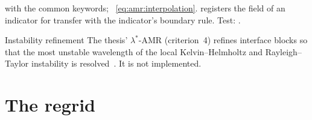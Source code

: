 \begin{implnote}
with the common keywords; ~\cref{eq:amr:interpolation}.
 registers the field of an indicator for transfer with the
indicator's boundary rule. Test:
.
\end{implnote}

\begin{deviation}{Instability refinement}\label{dev:amr:instability}
The thesis' $\lambda^{*}$-AMR (criterion~4) refines interface blocks so that
the most unstable wavelength of the local Kelvin--Helmholtz and
Rayleigh--Taylor instability is resolved~. It is not
implemented.
\end{deviation}

\section{The regrid}\label{sec:amr:regrid}
